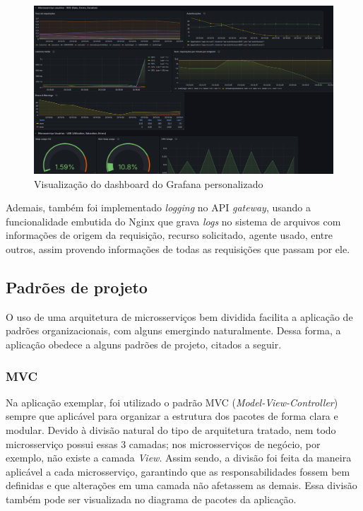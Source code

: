 \begin{figure}[htb]
	\caption{\label{figura-dashboard}Visualização do dashboard do Grafana personalizado}
	\begin{center}
	    \includegraphics[scale=0.4]{Imagens/dashboard.png}
	\end{center}
\end{figure}

Ademais, também foi implementado \emph{logging} no API \emph{gateway}, usando a funcionalidade embutida do Nginx que grava \emph{logs} no sistema de arquivos com informações de origem da requisição, recurso solicitado, agente usado, entre outros, assim provendo informações de todas as requisições que passam por ele.

\subsection{Padrões de projeto}
O uso de uma arquitetura de microsserviços bem dividida facilita a aplicação de padrões organizacionais, com alguns emergindo naturalmente. Dessa forma, a aplicação obedece a alguns padrões de projeto, citados a seguir.

\subsubsection*{MVC}
Na aplicação exemplar, foi utilizado o padrão MVC (\emph{Model-View-Controller}) sempre que aplicável para organizar a estrutura dos pacotes de forma clara e modular. Devido à divisão natural do tipo de arquitetura tratado, nem todo microsserviço possui essas 3 camadas; nos microsserviços de negócio, por exemplo, não existe a camada \emph{View}. Assim sendo, a divisão foi feita da maneira aplicável a cada microsserviço, garantindo que as responsabilidades fossem bem definidas e que alterações em uma camada não afetassem as demais. Essa divisão também pode ser visualizada no diagrama de pacotes da aplicação.

